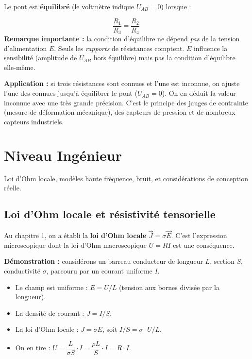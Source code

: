 \documentclass[12pt,a4paper,twoside]{book}
\begin{document}
Le pont est \textbf{équilibré} (le voltmètre indique $U_{AB} = 0$) lorsque :
\begin{formule}
\[
\boxed{\frac{R_1}{R_3} = \frac{R_2}{R_4}}
\]
\textbf{Remarque importante :} la condition d'équilibre ne dépend \textit{pas} de la tension d'alimentation $E$. Seuls les \textit{rapports} de résistances comptent. $E$ influence la sensibilité (amplitude de $U_{AB}$ hors équilibre) mais pas la condition d'équilibre elle-même.
\end{formule}

\begin{pratique}
\textbf{Application :} si trois résistances sont connues et l'une est inconnue, on ajuste l'une des connues jusqu'à équilibrer le pont ($U_{AB} = 0$). On en déduit la valeur inconnue avec une très grande précision. C'est le principe des jauges de contrainte (mesure de déformation mécanique), des capteurs de pression et de nombreux capteurs industriels.
\end{pratique}

\section{Niveau Ingénieur}

\begin{ingenieur}
Loi d'Ohm locale, modèles haute fréquence, bruit, et considérations de conception réelle.
\end{ingenieur}

\subsection{Loi d'Ohm locale et résistivité tensorielle}

Au chapitre 1, on a établi la \textbf{loi d'Ohm locale} $\vec{J} = \sigma\vec{E}$. C'est l'expression microscopique dont la loi d'Ohm macroscopique $U = RI$ est une conséquence.

\textbf{Démonstration :} considérons un barreau conducteur de longueur $L$, section $S$, conductivité $\sigma$, parcouru par un courant uniforme $I$.
\begin{itemize}[nosep]
\item Le champ est uniforme : $E = U/L$ (tension aux bornes divisée par la longueur).
\item La densité de courant : $J = I/S$.
\item La loi d'Ohm locale : $J = \sigma E$, soit $I/S = \sigma \cdot U/L$.
\item On en tire : $U = \dfrac{L}{\sigma S} \cdot I = \dfrac{\rho L}{S} \cdot I = R \cdot I$. \checkmark
\end{itemize}
\end{document}
